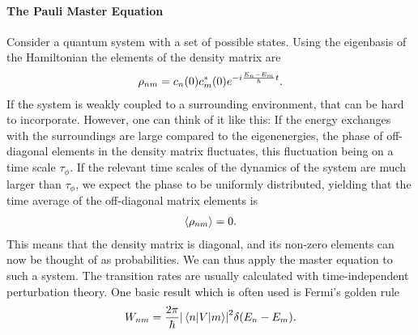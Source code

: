 \paragraph{The Pauli Master Equation}
Consider a quantum system with a set of possible states. Using the eigenbasis of the Hamiltonian the elements of the density matrix are
\begin{align*}
	\rho_{nm} = c_{n}(0)c^{*}_{m}(0)e^{-i\frac{E_{n} - E_{m}}{\hbar}t}.
\end{align*}
If the system is weakly coupled to a surrounding environment, that can be hard to incorporate. However, one can think of it like this: If the energy exchanges with the surroundings are large compared to the eigenenergies, the phase of off-diagonal elements in the density matrix fluctuates, this fluctuation being on a time scale $\tau_{\phi}$. If the relevant time scales of the dynamics of the system are much larger than $\tau_{\phi}$, we expect the phase to be uniformly distributed, yielding that the time average of the off-diagonal matrix elements is
\begin{align*}
	\expval{\rho_{nm}} = 0.
\end{align*}
This means that the density matrix is diagonal, and its non-zero elements can now be thought of as probabilities. We can thus apply the master equation to such a system. The transition rates are usually calculated with time-independent perturbation theory. One basic result which is often used is Fermi's golden rule
\begin{align*}
	W_{nm} = \frac{2\pi}{\hbar}\abs{\mel{n}{V}{m}}^{2}\delta(E_{n} - E_{m}).
\end{align*}